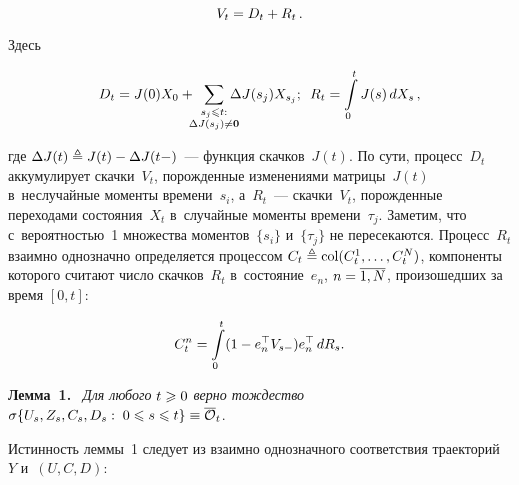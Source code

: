 \begin{multicols}{2}
\noindent
$$
V_t = D_t\hm+R_t\,.
$$

\vspace*{-2pt}

\noindent
Здесь

\vspace*{-6pt}

\noindent
  \begin{equation*}
D_t = J(0)X_0+\!\!\!\sum\limits_{\substack{{s_j \leqslant t:}\\{\Delta J(s_j) \neq \mathbf{0} }}} 
\!\!\!\!\!\Delta J(s_j)X_{s_j}; \enskip
R_t = \int\limits_0^t J(s)\,dX_s\,,
\end{equation*}

\vspace*{-2pt}

\noindent
где $ \Delta J(t) \triangleq  J(t)\hm -  \Delta J(t-)$~--- функция скачков~$J(t)$. По сути, процесс~$D_t$ 
аккумулирует скачки~$V_t$, по\-рож\-ден\-ные изменениями матрицы~$J(t)$ в~неслучайные моменты времени~$s_i$, 
а~$R_t$~--- скачки~$V_t$, порожденные переходами состояния~$X_t$ в~случайные моменты времени~$\tau_j$. 
Заметим, что с~вероятностью~1 множества моментов~$\{s_i\}$ и~$\{\tau_j\}$ не пересекаются.
Процесс~$R_t$ взаимно однозначно определяется процессом $C_t \hm\triangleq \mathop{\mathrm{col}}
(C^1_t,\ldots,C^N_t)$, компоненты которого считают число скачков~$R_t$ в~состояние~$e_n$, $n \hm= 
\overline{1,N}$, произошедших за время $[0,t]$:

\vspace*{2pt}

\noindent
$$
 C^n_t\hm = \int\limits_0^t (1-e^{\top}_nV_{s-})e^{\top}_n\,dR_s.
 $$
 
 
 \noindent
 \textbf{Лемма~1.}\
\textit{Для любого $ t \hm\geqslant 0$ верно тождество 
$\sigma\{U_s, Z_s, C_s, D_s:\; 0 \hm\leqslant s  \hm\leqslant t\} \hm\equiv \overline{\mathcal{O}}_t$}.

\vspace*{3pt}

 Истинность леммы~1 следует из взаимно однозначного соответствия траекторий~$Y$ и~$(U, C, D)$:
 
 \vspace*{-5pt}
 

\end{multicols}
